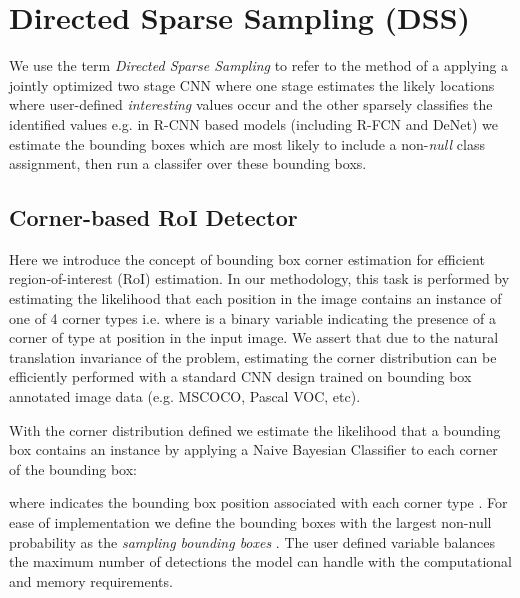 \documentclass[10pt,twocolumn]{article}
\begin{document}
\section{Directed Sparse Sampling (DSS)} \label{sec:dss}

We use the term \textit{Directed Sparse Sampling} to refer to the method of a applying a jointly optimized two stage CNN where one stage estimates the likely locations where user-defined \textit{interesting} values occur and the other sparsely classifies the identified values e.g. in R-CNN based models (including R-FCN and DeNet) we estimate the bounding boxes which are most likely to include a non-\textit{null} class assignment, then run a classifer over these bounding boxs. 

\subsection{Corner-based RoI Detector}
Here we introduce the concept of bounding box corner estimation for efficient region-of-interest (RoI) estimation. In our methodology, this task is performed by estimating the likelihood that each position in the image contains an instance of one of 4 corner types i.e.  where  is a binary variable indicating the presence of a corner of type  at position  in the input image. We assert that due to the natural translation invariance of the problem, estimating the corner distribution can be efficiently performed with a standard CNN design trained on bounding box annotated image data (e.g. MSCOCO\cite{mscoco}, Pascal VOC\cite{pascal-voc}, etc). 

With the corner distribution defined we estimate the likelihood that a bounding box  contains an instance by applying a Naive Bayesian Classifier to each corner of the bounding box:



where  indicates the bounding box position associated with each corner type . For ease of implementation we define the  bounding boxes 
with the largest non-null probability  as the \textit{sampling bounding boxes} . The user defined variable  balances the maximum number of detections the model can handle with the computational and memory requirements. 
\end{document}

